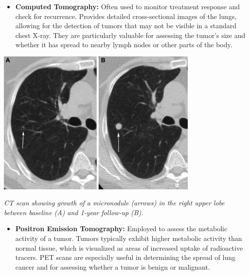 \begin{itemize}
    \item \textbf{Computed Tomography:} Often used to monitor treatment response and check for 
    recurrence. Provides detailed cross-sectional images of the lungs, allowing for the detection of 
    tumors that may not be visible in a standard chest X-ray. They are particularly valuable for 
    assessing the tumor’s size and whether it has spread to nearby lymph nodes or other parts of the 
    body.
\end{itemize}

\vspace{1em}
\begin{center}
    \includegraphics[width=0.75\textwidth]{../assets/04-diagnosis/lc-ct-micronodule-growth.jpg}

    \small\textit{CT scan showing growth of a micronodule (arrows) in the right upper lobe between 
    baseline (A) and 1-year follow-up (B). \cite{MUNDEN20191538}}
\end{center}
\vspace{1em}

\begin{itemize}
    \item \textbf{Positron Emission Tomography:} Employed to assess the metabolic activity of a 
    tumor. Tumors typically exhibit higher metabolic activity than normal tissue, which is 
    visualized as areas of increased uptake of radioactive tracers. PET scans are especially useful 
    in determining the spread of lung cancer and for assessing whether a tumor is benign or 
    malignant.
\end{itemize}

